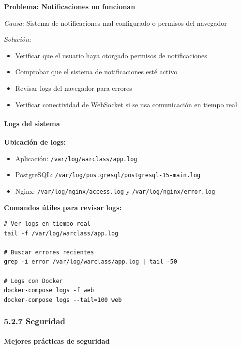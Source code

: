 \textbf{Problema: Notificaciones no funcionan}

\textit{Causa:} Sistema de notificaciones mal configurado o permisos del navegador

\textit{Solución:}
\begin{itemize}
	\item Verificar que el usuario haya otorgado permisos de notificaciones
	\item Comprobar que el sistema de notificaciones esté activo
	\item Revisar logs del navegador para errores
	\item Verificar conectividad de WebSocket si se usa comunicación en tiempo real
\end{itemize}

\paragraph{Logs del sistema}

\textbf{Ubicación de logs:}

\begin{itemize}
	\item Aplicación: \texttt{/var/log/warclass/app.log}
	\item PostgreSQL: \texttt{/var/log/postgresql/postgresql-15-main.log}
	\item Nginx: \texttt{/var/log/nginx/access.log} y \texttt{/var/log/nginx/error.log}
\end{itemize}

\textbf{Comandos útiles para revisar logs:}

\begin{verbatim}
# Ver logs en tiempo real
tail -f /var/log/warclass/app.log

# Buscar errores recientes
grep -i error /var/log/warclass/app.log | tail -50

# Logs con Docker
docker-compose logs -f web
docker-compose logs --tail=100 web
\end{verbatim}

\subsubsection{5.2.7 Seguridad}

\paragraph{Mejores prácticas de seguridad}

